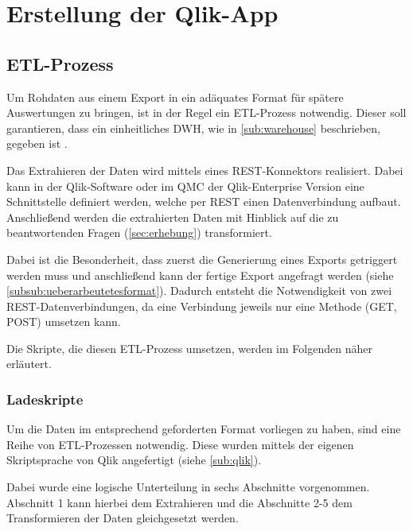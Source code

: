 
\section{Erstellung der Qlik-App}
\label{sec:erstellung}
\subsection{ETL-Prozess}
\label{sub:etl}
Um Rohdaten aus einem Export in ein adäquates Format für spätere Auswertungen zu bringen, ist in der Regel ein \gls{ETL}-Prozess notwendig.
Dieser soll garantieren, dass ein einheitliches \gls{DWH}, wie in \ref{sub:warehouse} beschrieben, gegeben ist \cite[S.49]{Gabriel.2011}.

Das Extrahieren der Daten wird mittels eines \gls{REST}-Konnektors realisiert.
Dabei kann in der Qlik-Software oder im \gls{QMC} der Qlik-Enterprise Version eine Schnittstelle definiert werden, welche per REST einen Datenverbindung aufbaut.
Anschließend werden die extrahierten Daten mit Hinblick auf die zu beantwortenden Fragen (\ref{sec:erhebung}) transformiert.

Dabei ist die Besonderheit, dass zuerst die Generierung eines Exports getriggert werden muss und anschließend kann der fertige Export angefragt werden (siehe \ref{subsub:ueberarbeutetesformat}).
Dadurch entsteht die Notwendigkeit von zwei REST-Datenverbindungen, da eine Verbindung jeweils nur eine Methode (GET, POST) umsetzen kann.

Die Skripte, die diesen ETL-Prozess umsetzen, werden im Folgenden näher erläutert.

\subsubsection{Ladeskripte}
\label{subsub:scripts}

Um die Daten im entsprechend geforderten Format vorliegen zu haben, sind eine Reihe von \gls{ETL}-Prozessen notwendig.
Diese wurden mittels der eigenen Skriptsprache von Qlik angefertigt (siehe \ref{sub:qlik}).

Dabei wurde eine logische Unterteilung in sechs Abschnitte vorgenommen.
Abschnitt 1 kann hierbei dem Extrahieren und die Abschnitte 2-5 dem Transformieren der Daten gleichgesetzt werden.

